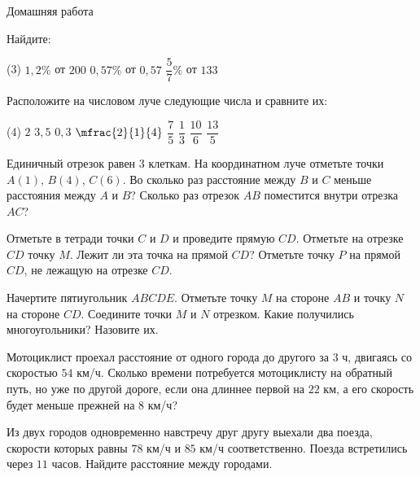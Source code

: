 \begin{homework}[number=3]
	\begin{listofex}
		\item Домашняя работа
	\end{listofex}
\end{homework}

\begin{class}[number=4]
	\begin{listofex}
		\item Найдите:
		\begin{tasks}(3)
			\task \( 1,2\% \) от \( 200 \)
			\task \( 0,57\% \) от \( 0,57 \)
			\task \(\dfrac{5}{7}\%\) от \( 133 \)
		\end{tasks}
		\item Расположите на числовом луче следующие числа и сравните их:
		\begin{tasks}(4)
			\task \( 2 \)
			\task \( 3,5 \)
			\task \( 0,3 \)
			\task \( \mfrac{2}{1}{4} \)
			\task \( \dfrac{7}{5} \)
			\task \( \dfrac{1}{3} \)
			\task \( \dfrac{10}{6} \)
			\task \( \dfrac{13}{5} \)
		\end{tasks}
		\item Единичный отрезок равен \( 3 \) клеткам. На координатном луче отметьте точки \( A(1) \), \( B(4) \), \( C(6) \). Во сколько раз расстояние между \( B \) и \( C \) меньше расстояния между \( A \) и \( B \)? Сколько раз отрезок \( AB \) поместится внутри отрезка \( AC \)?
		\item Отметьте в тетради точки \( C \) и \( D \) и проведите прямую \( CD \). Отметьте на отрезке \( CD \) точку \( M \). Лежит ли эта точка на прямой \( CD \)? Отметьте точку \( P \) на прямой \( CD \), не лежащую на отрезке \( CD \). 
		\item Начертите пятиугольник \( ABCDE \). Отметьте точку \( M \) на стороне \( AB \) и точку \( N \) на стороне \( CD \). Соедините точки \( M \) и \( N \) отрезком. Какие получились многоугольники? Назовите их.
		\item Мотоциклист проехал расстояние от одного города до другого за \( 3 \) ч, двигаясь со скоростью \( 54 \) км/ч. Сколько времени потребуется мотоциклисту на обратный путь, но уже по другой дороге, если она длиннее первой на \( 22 \) км, а его скорость будет меньше прежней на \( 8 \) км/ч?
		\item Из двух городов одновременно навстречу друг другу выехали два поезда, скорости
		которых равны \( 78 \) км/ч и \( 85 \) км/ч соответственно. Поезда встретились через \( 11 \) часов. Найдите расстояние между городами.

\end{listofex}
\end{class}
